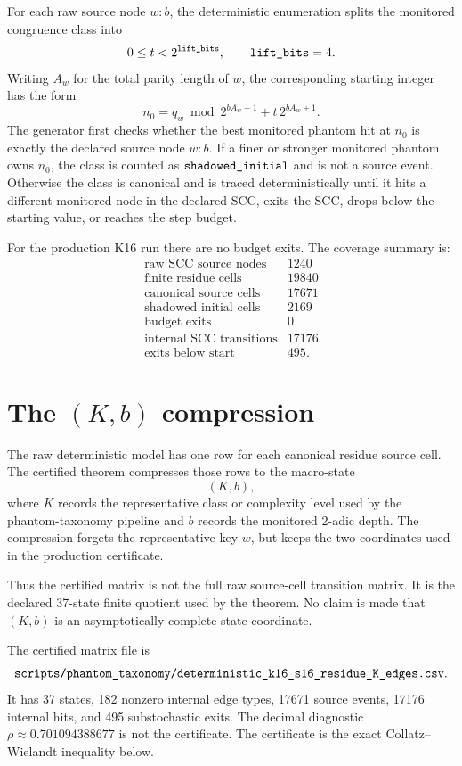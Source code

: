\documentclass[11pt,a4paper]{article}
\newcommand{\ttbr}[1]{\ifmmode\text{\texttt{\detokenize{#1}}}\else\texttt{\detokenize{#1}}\fi}
\begin{document}
For each raw source node \(w:b\), the deterministic enumeration splits
the monitored congruence class into
\[
  0 \leq t < 2^{\ttbr{lift_bits}},
  \qquad \ttbr{lift_bits}=4.
\]
Writing \(A_w\) for the total parity length of \(w\), the corresponding
starting integer has the form
\[
  n_0 = q_w \bmod 2^{bA_w+1} + t\,2^{bA_w+1}.
\]
The generator first checks whether the best monitored phantom hit at
\(n_0\) is exactly the declared source node \(w:b\).  If a finer or
stronger monitored phantom owns \(n_0\), the class is counted as
\(\ttbr{shadowed_initial}\) and is not a source event.  Otherwise the
class is canonical and is traced deterministically until it hits a
different monitored node in the declared SCC, exits the SCC, drops below
the starting value, or reaches the step budget.

For the production K16 run there are no budget exits.  The coverage
summary is:
\[
\begin{array}{lr}
\text{raw SCC source nodes} & 1240\\
\text{finite residue cells} & 19840\\
\text{canonical source cells} & 17671\\
\text{shadowed initial cells} & 2169\\
\text{budget exits} & 0\\
\text{internal SCC transitions} & 17176\\
\text{exits below start} & 495.
\end{array}
\]

\section{The \((K,b)\) compression}

The raw deterministic model has one row for each canonical residue
source cell.  The certified theorem compresses those rows to the
macro-state
\[
  (K,b),
\]
where \(K\) records the representative class or complexity level used
by the phantom-taxonomy pipeline and \(b\) records the monitored 2-adic
depth.  The compression forgets the representative key \(w\), but keeps
the two coordinates used in the production certificate.

Thus the certified matrix is not the full raw source-cell transition
matrix.  It is the declared 37-state finite quotient used by the
theorem.  No claim is made that \((K,b)\) is an asymptotically complete
state coordinate.

The certified matrix file is
\[
\ttbr{scripts/phantom_taxonomy/deterministic_k16_s16_residue_K_edges.csv}.
\]
It has 37 states, 182 nonzero internal edge types, 17671 source events,
17176 internal hits, and 495 substochastic exits.  The decimal
diagnostic \(\rho\approx0.701094388677\) is not the certificate.  The
certificate is the exact Collatz--Wielandt inequality below.
\end{document}
